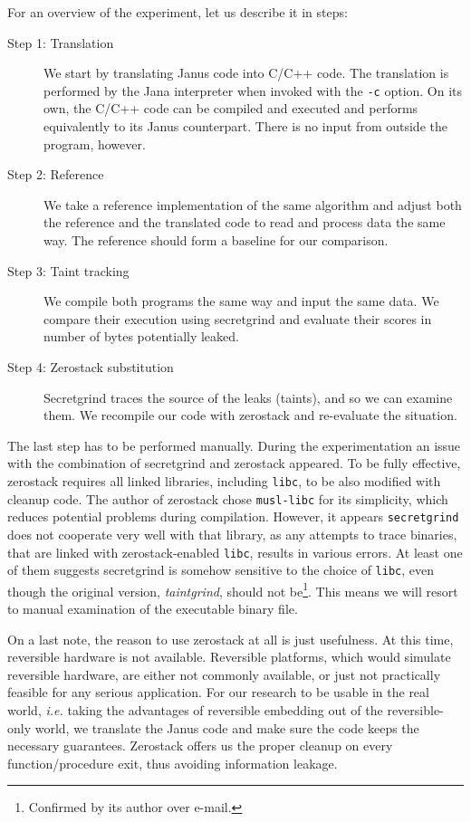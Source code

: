 \documentclass[a4paper,10pt,openright]{memoir}
\newcommand{\ie}{\emph{i.e.}\xspace}
\newcommand{\term}[1]{\textit{#1}}
\newcommand{\code}[1]{\texttt{#1}}
\begin{document}
For an overview of the experiment, let us describe it in steps:

\begin{description}

\item[Step 1: Translation] We start by translating Janus code into 
C/C++ code. The translation is performed by the Jana interpreter when 
invoked with the \code{-c} option. On its own, the C/C++ code can be 
compiled and executed and performs equivalently to its Janus 
counterpart. There is no input from outside the program, however.

\item[Step 2: Reference] We take a reference implementation of the same 
algorithm and adjust both the reference and the translated code to read 
and process data the same way. The reference should form a baseline for 
our comparison.

\item[Step 3: Taint tracking] We compile both programs the same way and 
input the same data. We compare their execution using 
secretgrind and evaluate their scores in number of bytes 
potentially leaked.

\item[Step 4: Zerostack substitution] Secretgrind traces the source of 
the leaks (taints), and so we can examine them. We recompile our code 
with zerostack and re-evaluate the situation.

\end{description}

The last step has to be performed manually. During the 
experimentation an issue with the combination of secretgrind and 
zerostack appeared. To be fully effective, zerostack requires all 
linked libraries, including \code{libc}, to be also modified with 
cleanup code. The author of zerostack chose \code{musl-libc} for its 
simplicity, which reduces potential problems during compilation. 
However, it appears \code{secretgrind} does not cooperate very well 
with that library, as any attempts to trace binaries, that are linked 
with zerostack-enabled \code{libc}, results in various errors. At least 
one of them suggests secretgrind is somehow sensitive to the choice of 
\code{libc}, even though the original version, \term{taintgrind}, 
should not be\footnote{Confirmed by its author over e-mail.}. This 
means we will resort to manual examination of the executable binary 
file.

On a last note, the reason to use zerostack at all is just 
usefulness. At this time, reversible hardware is not available. 
Reversible platforms, which would simulate reversible hardware, are 
either not commonly available, or just not practically feasible for any 
serious application. For our research to be usable in the real world, 
\ie taking the advantages of reversible embedding out of the 
reversible-only world, we translate the Janus code and make sure the 
code keeps the necessary guarantees. Zerostack offers us the 
proper cleanup on every function/procedure exit, thus avoiding 
information leakage.
\end{document}
